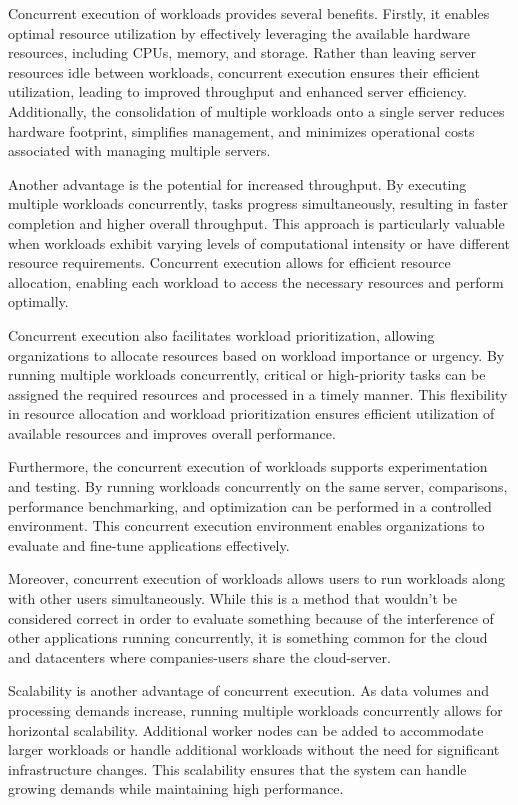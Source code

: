 Concurrent execution of workloads provides several benefits.
Firstly, it enables optimal resource utilization by effectively
leveraging the available hardware resources, including CPUs, memory,
and storage. Rather than leaving server resources idle between
workloads, concurrent execution ensures their efficient utilization,
leading to improved throughput and enhanced server efficiency.
Additionally, the consolidation of multiple workloads onto a single
server reduces hardware footprint, simplifies management, and
minimizes operational costs associated with managing multiple servers.

Another advantage is the potential for increased throughput. By
executing multiple workloads concurrently, tasks progress
simultaneously, resulting in faster completion and higher overall
throughput. This approach is particularly valuable when workloads
exhibit varying levels of computational intensity or have different
resource requirements. Concurrent execution allows for efficient
resource allocation, enabling each workload to access the necessary
resources and perform optimally.

Concurrent execution also facilitates workload prioritization,
allowing organizations to allocate resources based on workload
importance or urgency. By running multiple workloads concurrently,
critical or high-priority tasks can be assigned the required resources
and processed in a timely manner. This flexibility in resource
allocation and workload prioritization ensures efficient utilization
of available resources and improves overall performance.

Furthermore, the concurrent execution of workloads supports
experimentation and testing. By running workloads concurrently on the
same server, comparisons, performance benchmarking, and optimization
can be performed in a controlled environment. This concurrent
execution environment enables organizations to evaluate and fine-tune
applications effectively.

Moreover, concurrent execution of workloads allows users to run
workloads along with other users simultaneously. While this is a
method that wouldn't be considered correct in order to evaluate
something because of the interference of other applications running
concurrently, it is something common for the cloud and datacenters
where companies-users share the cloud-server.

Scalability is another advantage of concurrent execution. As data
volumes and processing demands increase, running multiple workloads
concurrently allows for horizontal scalability. Additional 
worker nodes can be added to accommodate larger workloads or handle
additional workloads without the need for significant infrastructure
changes. This scalability ensures that the system can handle growing
demands while maintaining high performance.

